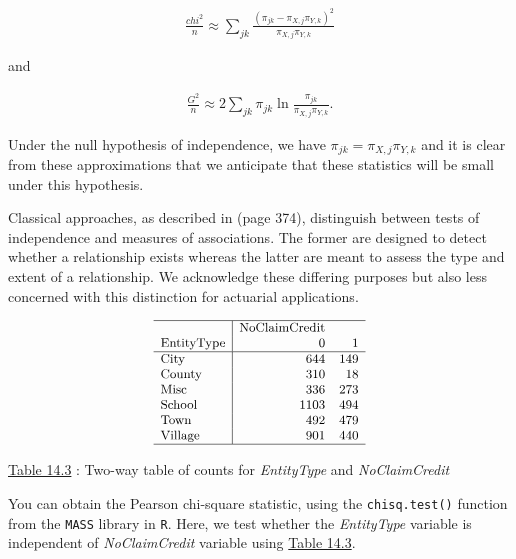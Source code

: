 \documentclass[]{book}
\theoremstyle{definition}
\theoremstyle{definition}
\theoremstyle{definition}
\theoremstyle{remark}
\begin{document}
\begin{eqnarray*}
\frac{chi^2}{n} \approx \sum_{jk} \frac{(\pi_{jk}- \pi_{X,j}\pi_{Y,k})^2}{\pi_{X,j}\pi_{Y,k}}
\end{eqnarray*}

and

\begin{eqnarray*}
\frac{G^2}{n} \approx 2 \sum_{jk} \pi_{jk} \ln\frac{\pi_{jk}}{\pi_{X,j}\pi_{Y,k}} .
\end{eqnarray*}

Under the null hypothesis of independence, we have
\(\pi_{jk} =\pi_{X,j}\pi_{Y,k}\) and it is clear from these
approximations that we anticipate that these statistics will be small
under this hypothesis.

Classical approaches, as described in \citep{bishop1975discrete} (page
374), distinguish between tests of independence and measures of
associations. The former are designed to detect whether a relationship
exists whereas the latter are meant to assess the type and extent of a
relationship. We acknowledge these differing purposes but also less
concerned with this distinction for actuarial applications.

\[
{\small \begin{matrix}
\begin{array}{l|rr} 
    \hline
                  & \text{NoClaimCredit} &  \\
       \text{EntityType} & 0     & 1      \\
  \hline
            \text{City}    & 644  & 149 \\
          \text{County}    & 310  &  18 \\
            \text{Misc}    & 336  & 273 \\
          \text{School}    & 1103 & 494 \\
           \text{Town}     & 492  & 479 \\
         \text{Village}    & 901  & 440 \\
   \hline
\end{array}
\end{matrix}}
\]

\protect\hyperlink{tab:14.3}{Table 14.3} : Two-way table of counts for
\emph{EntityType} and \emph{NoClaimCredit}

You can obtain the Pearson chi-square statistic, using the
\texttt{chisq.test()} function from the \texttt{MASS} library in
\texttt{R}. Here, we test whether the \emph{EntityType} variable is
independent of \emph{NoClaimCredit} variable using
\protect\hyperlink{tab:14.3}{Table 14.3}.
\end{document}
